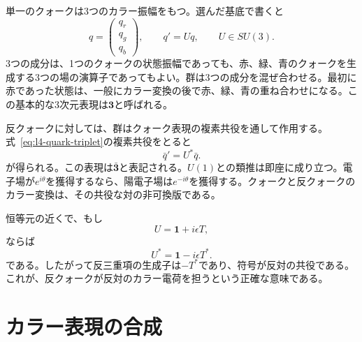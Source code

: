 単一のクォークは3つのカラー振幅をもつ。選んだ基底で書くと
\begin{equation}
q=
\begin{pmatrix}
q_r\\q_g\\q_b
\end{pmatrix},
\qquad
q'=Uq,
\qquad U\in SU(3).
\label{eq:l4-quark-triplet}
\end{equation}
3つの成分は、1つのクォークの状態振幅であっても、赤、緑、青のクォークを生成する3つの場の演算子であってもよい。群は3つの成分を混ぜ合わせる。最初に赤であった状態は、一般にカラー変換の後で赤、緑、青の重ね合わせになる。この基本的な3次元表現は\(\boldsymbol 3\)と呼ばれる。

反クォークに対しては、群はクォーク表現の複素共役を通して作用する。式~\eqref{eq:l4-quark-triplet}の複素共役をとると
\begin{equation}
\bar q'=U^*\bar q.
\end{equation}
が得られる。この表現は\(\bar{\boldsymbol 3}\)と表記される。\(U(1)\)との類推は即座に成り立つ。電子場が\(e^{i\theta}\)を獲得するなら、陽電子場は\(e^{-i\theta}\)を獲得する。クォークと反クォークのカラー変換は、その共役な対の非可換版である。

恒等元の近くで、もし
\begin{equation}
U=\boldsymbol 1+i\epsilon T,
\end{equation}
ならば
\begin{equation}
U^*=\boldsymbol 1-i\epsilon T^*.
\end{equation}
である。したがって反三重項の生成子は\(-T^*\)であり、符号が反対の共役である。これが、反クォークが反対のカラー電荷を担うという正確な意味である。

\begin{classroomqa}
\end{classroomqa}

\section{カラー表現の合成}

